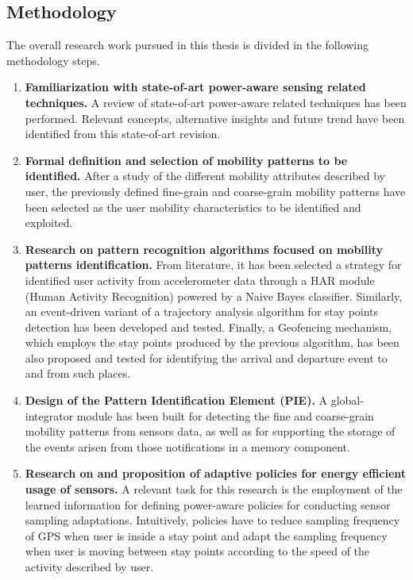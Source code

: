 \documentclass[ENG,PhD]{cinvestav}
\begin{document}
\subsection{Methodology}
The overall research work pursued in this thesis is divided in the following methodology steps.
\begin{enumerate}
  \item \textbf{Familiarization with state-of-art power-aware sensing related techniques.}
  A review of state-of-art power-aware related techniques has been performed.
  Relevant concepts, alternative insights and future trend have been identified from this state-of-art revision.
  
  \item \textbf{Formal definition and selection of mobility patterns to be identified.}
  After a study of the different mobility attributes described by user, the previously defined fine-grain and coarse-grain mobility patterns have been selected as the user mobility characteristics to be identified and exploited.

  \item \textbf{Research on pattern recognition algorithms focused on mobility patterns identification.}
  From literature, it has been selected a strategy for identified user activity from accelerometer data through a HAR module (Human Activity Recognition) powered by a Naive Bayes classifier.
  Similarly, an event-driven variant of a trajectory analysis algorithm for stay points detection has been developed and tested.
  Finally, a Geofencing mechanism, which employs the stay points produced by the previous algorithm, has been also proposed and tested for identifying the arrival and departure event to and from such places.
  
  \item \textbf{Design of the Pattern Identification Element (PIE).}
  A global-integrator module has been built for detecting the fine and coarse-grain mobility patterns from sensors data, as well as for supporting the storage of the events arisen from those notifications in a memory component.
  

  \item \textbf{Research on and proposition of adaptive policies for energy efficient usage of sensors.}
  A relevant task for this research is the employment of the learned information for defining power-aware policies for conducting sensor sampling adaptations.
  Intuitively, policies have to reduce sampling frequency of GPS when user is inside a stay point and adapt the sampling frequency when user is moving between stay points according to the speed of the activity described by user.
    


\end{enumerate}
\end{document}
